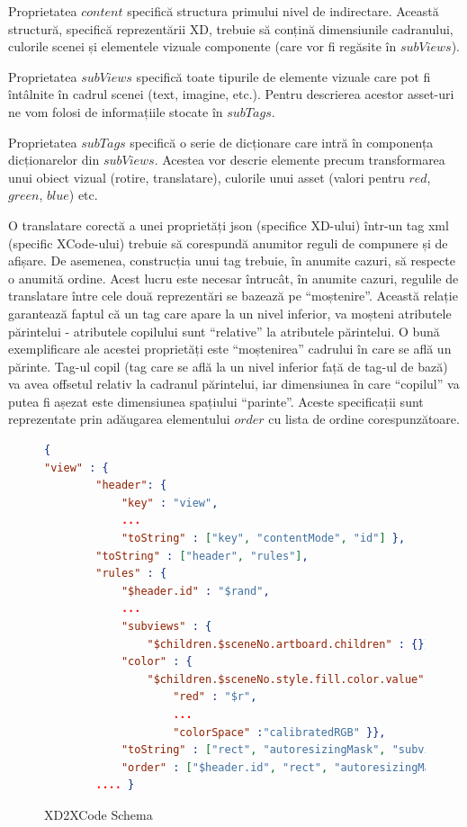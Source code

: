 Proprietatea $content$ specifică structura primului nivel de indirectare. Această structură, specifică reprezentării XD,  trebuie să conțină dimensiunile cadranului, culorile scenei și elementele vizuale componente (care vor fi regăsite în $subViews$).

Proprietatea $subViews$ specifică toate tipurile de elemente vizuale care pot fi întâlnite în cadrul scenei (text, imagine, etc.). Pentru descrierea acestor asset-uri ne vom folosi de informațiile stocate în $subTags$.

Proprietatea $subTags$ specifică o serie de dicționare care intră în componența dicționarelor din $subViews$. Acestea vor descrie elemente precum transformarea unui obiect vizual (rotire, translatare), culorile unui asset (valori pentru $red$, $green$, $blue$) etc.

O translatare corectă a unei proprietăți json (specifice XD-ului) într-un tag xml (specific XCode-ului) trebuie să corespundă anumitor reguli de compunere și de afișare. De asemenea, construcția unui tag trebuie, în anumite cazuri, să respecte o anumită ordine. Acest lucru este necesar întrucât, în anumite cazuri, regulile de translatare între cele două reprezentări se bazează pe “moștenire”. Această relație garantează faptul că un tag care apare la un nivel inferior, va moșteni atributele părintelui - atributele copilului sunt “relative” la atributele părintelui. O bună exemplificare ale acestei proprietăți este “moștenirea” cadrului în care se află un părinte. Tag-ul copil (tag care se află la un nivel inferior față de tag-ul de bază) va avea offsetul relativ la cadranul părintelui, iar dimensiunea în care “copilul” va putea fi așezat este dimensiunea spațiului “parinte”. Aceste specificații sunt reprezentate prin adăugarea elementului $order$ cu lista de ordine corespunzătoare.

\begin{figure}
\begin{lstlisting}[language=json,firstnumber=1]
{
"view" : {
        "header": {
            "key" : "view",
            ...
            "toString" : ["key", "contentMode", "id"] },
        "toString" : ["header", "rules"],
        "rules" : { 
            "$header.id" : "$rand",
            ...
            "subviews" : {
                "$children.$sceneNo.artboard.children" : {}},
            "color" : {
                "$children.$sceneNo.style.fill.color.value" : {
                    "red" : "$r",
                    ...
                    "colorSpace" :"calibratedRGB" }},
            "toString" : ["rect", "autoresizingMask", "subviews", "color"],
            "order" : ["$header.id", "rect", "autoresizingMask", "color", "subviews"] }
        .... }
\end{lstlisting}
\caption{XD2XCode Schema} \label{fig:XD2XCode Schema}
\end{figure}

